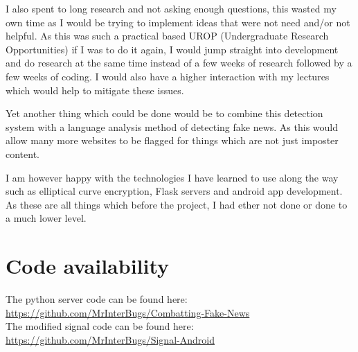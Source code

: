 \documentclass[11pt,a4paper]{report}
\begin{document}
I also spent to long research and not asking enough questions, this wasted my own time as I would be trying to implement ideas that were not need and/or not helpful. As this was such a practical based UROP (Undergraduate Research Opportunities) if I was to do it again, I would jump straight into development and do research at the same time instead of a few weeks of research followed by a few weeks of coding. I would also have a higher interaction with my lectures which would help to mitigate these issues.

Yet another thing which could be done would be to combine this detection system with a language analysis method of detecting fake news. As this would allow many more websites to be flagged for things which are not just imposter content.

I am however happy with the technologies I have learned to use along the way such as elliptical curve encryption, Flask servers and android app development. As these are all things which before the project, I had ether not done or done to a much lower level.
\newpage
\section{Code availability}
The python server code can be found here: \\ \url{https://github.com/MrInterBugs/Combatting-Fake-News} \\ The modified signal code can be found here: \\ \url{https://github.com/MrInterBugs/Signal-Android}
\newpage

\end{document}

